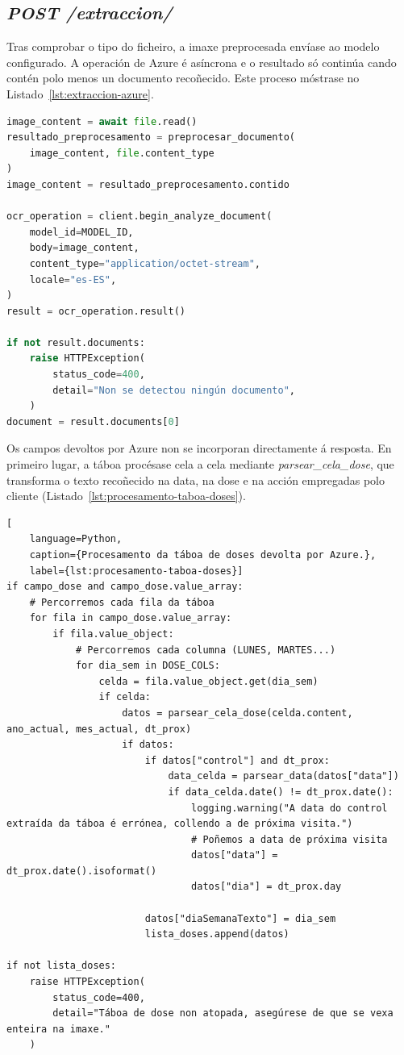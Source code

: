 \subsection{\textit{POST /extraccion/}}

Tras comprobar o tipo do ficheiro, a imaxe preprocesada envíase ao modelo configurado. A operación de Azure é asíncrona e o resultado só continúa cando contén polo menos un documento recoñecido. Este proceso móstrase no Listado~\ref{lst:extraccion-azure}.

\begin{lstlisting}[language=Python,
    caption={Preprocesamento e chamada a Azure Document Intelligence.},
    label={lst:extraccion-azure}]
image_content = await file.read()
resultado_preprocesamento = preprocesar_documento(
    image_content, file.content_type
)
image_content = resultado_preprocesamento.contido

ocr_operation = client.begin_analyze_document(
    model_id=MODEL_ID,
    body=image_content,
    content_type="application/octet-stream",
    locale="es-ES",
)
result = ocr_operation.result()

if not result.documents:
    raise HTTPException(
        status_code=400,
        detail="Non se detectou ningún documento",
    )
document = result.documents[0]
\end{lstlisting}

Os campos devoltos por Azure non se incorporan directamente á resposta. En primeiro lugar, a táboa procésase cela a cela mediante \textit{parsear\_cela\_dose}, que transforma o texto recoñecido na data, na dose e na acción empregadas polo cliente (Listado~\ref{lst:procesamento-taboa-doses}).

\begin{lstlisting}[
    language=Python,
    caption={Procesamento da táboa de doses devolta por Azure.},
    label={lst:procesamento-taboa-doses}]
if campo_dose and campo_dose.value_array:
    # Percorremos cada fila da táboa
    for fila in campo_dose.value_array:
        if fila.value_object:
            # Percorremos cada columna (LUNES, MARTES...)
            for dia_sem in DOSE_COLS:
                celda = fila.value_object.get(dia_sem)
                if celda:
                    datos = parsear_cela_dose(celda.content, ano_actual, mes_actual, dt_prox)
                    if datos:
                        if datos["control"] and dt_prox:
                            data_celda = parsear_data(datos["data"])
                            if data_celda.date() != dt_prox.date():
                                logging.warning("A data do control extraída da táboa é errónea, collendo a de próxima visita.")
                                # Poñemos a data de próxima visita
                                datos["data"] = dt_prox.date().isoformat()
                                datos["dia"] = dt_prox.day

                        datos["diaSemanaTexto"] = dia_sem
                        lista_doses.append(datos)

if not lista_doses:
    raise HTTPException(
        status_code=400,
        detail="Táboa de dose non atopada, asegúrese de que se vexa enteira na imaxe."
    )
\end{lstlisting}

